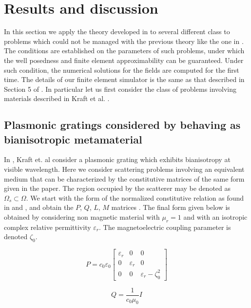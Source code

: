 \section{Results and discussion}  
In this section we apply the theory developed in \cite{kalarickel2020well} to 
several different class to problems which could not be managed with the 
previous theory like the one in \cite{bianisotropi_m3as}.
The conditions are established on the parameters of such problems, 
under which the well posedness and finite element 
approximability  can be guaranteed.
Under such condition, the numerical solutions for the fields are 
computed for the first time.
The details of our finite element simulator is the same as that 
described in Section 5 of \cite{kalarickel2020well}.
In particular let us first consider the class of problems involving materials described in Kraft et al. \cite{pendry2016acsphotonics}.

\subsection{Plasmonic gratings considered by \cite{pendry2016acsphotonics} behaving as bianisotropic metamaterial}
In  \cite{pendry2016acsphotonics}, Kraft et. al consider a plasmonic grating 
which exhibits bianisotropy at visible wavelength.
Here we consider scattering problems involving an equivalent medium 
that can be characterized by the constitutive matrices of the same form 
given in the paper.
The region occupied by the scatterer may be denoted as $\Omega_s \subset \Omega$. 
We start with the form of the normalized constitutive relation as found in 
\cite{chen2005retrieval} and \cite{li2009determination}, 
and obtain the $P$, $Q$, $L$, $M$ matrices \cite{noiregolarita}.
The final form given below is obtained by considering 
non magnetic material with 
$\mu_r=1$ and with an isotropic complex relative permittivity $\varepsilon_r$. 
The magnetoelectric coupling parameter is denoted $\zeta_0$. 

\begin{equation}  \label{constitutive_kraft_P}
P = c_0 \varepsilon_0 
\begin{bmatrix}
\varepsilon_r & 0 & 0 \\
0 &  \varepsilon_r & 0 \\
0 & 0 & \varepsilon_r-\zeta_0^2
\end{bmatrix} 
\end{equation}

\begin{equation} \label{constitutive_kraft_Q}
Q = \frac{1}{c_0\mu_0}I
\end{equation}

